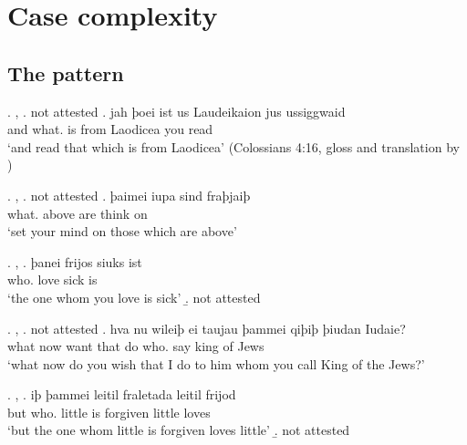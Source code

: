 
\chapter{Case complexity}

\section{The pattern}

\ex. , 
\a.  not attested
\bg. jah þoei ist us Laudeikaion jus ussiggwaid\\
 and what. is\scsub{[nom]} from Laodicea you read\scsub{[acc]}\\
 `and read that which is from Laodicea' \hfill (Colossians 4:16, gloss and translation by \citealt[357]{harbert1978})

\ex. , 
\a.  not attested
\bg. þaimei iupa sind fraþjaiþ\\
 what. above are\scsub{[nom]} {think on}\scsub{[dat]}\\
 `set your mind on those which are above' 

\ex. , 
\ag. þanei frijos siuks ist\\
 who. love\scsub{[acc]} sick is\scsub{[nom]}\\
 `the one whom you love is sick' 
\b.  not attested

\ex. , 
\a.  not attested
\bg. hva nu wileiþ ei taujau þammei qiþiþ þiudan Iudaie?\\
 what now want that do\scsub{[dat]} who. say\scsub{[acc]} king {of Jews}\\
 `what now do you wish that I do to him whom you call King of the Jews?' 

\ex. , 
\ag. iþ þammei leitil fraletada leitil frijod\\
 but who. little {is forgiven\scsub{[dat]}} little loves\scsub{[nom]}\\
 `but the one whom little is forgiven loves little' 
\b.  not attested

